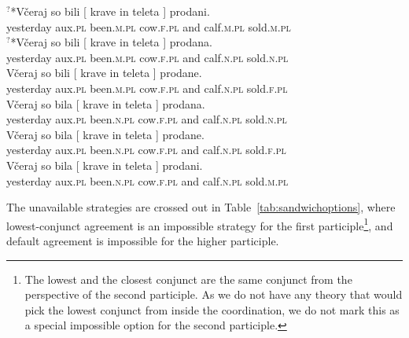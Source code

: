 \documentclass[output=paper
,modfonts
,nonflat]{langsci/langscibook}
\begin{document}
\begin{exe}
\ex \label{allpossiblesand}
\begin{xlist}
\ex \label{alldefdef}\gll $^?$*Včeraj      so    bili       [ krave    in    teleta ]    prodani.\\
yesterday aux.\textsc{pl} been.\textsc{m.pl} {} cow.\textsc{f.pl} and calf.\textsc{m.pl} {}   sold.\textsc{m.pl}\\
\ex \label{alldefcca}\gll $^?$*Včeraj      so    bili       [ krave    in    teleta ]    prodana. \\
yesterday aux.\textsc{pl} been.\textsc{m.pl} {} cow.\textsc{f.pl} and calf.\textsc{n.pl} {}   sold.\textsc{n.pl}\\
\ex \label{alldefhca}\gll  *Včeraj      so    bili       [ krave    in    teleta ]    prodane. \\
yesterday aux.\textsc{pl} been.\textsc{m.pl} {} cow.\textsc{f.pl} and calf.\textsc{n.pl} {}   sold.\textsc{f.pl}\\
\ex \label{alllcacca}\gll  *Včeraj      so    bila       [ krave    in    teleta ]    prodana. \\
yesterday aux.\textsc{pl} been.\textsc{n.pl} {} cow.\textsc{f.pl} and calf.\textsc{n.pl} {}   sold.\textsc{n.pl}\\
\ex \label{alllcahca}\gll  *Včeraj      so    bila       [ krave    in    teleta ]    prodane. \\
yesterday aux.\textsc{pl} been.\textsc{n.pl} {} cow.\textsc{f.pl} and calf.\textsc{n.pl} {}   sold.\textsc{f.pl}\\
\ex \label{alllcadef}\gll  *Včeraj      so    bila       [ krave    in    teleta ]    prodani. \\
yesterday aux.\textsc{pl} been.\textsc{n.pl} {} cow.\textsc{f.pl} and calf.\textsc{n.pl} {}   sold.\textsc{m.pl}\\
\end{xlist}
\end{exe}
The unavailable strategies are crossed out in Table~\ref{tab:sandwichoptions}, where lowest-conjunct agreement is an impossible strategy for the first participle\footnote{The lowest and the closest conjunct are the same conjunct from the perspective of the second participle. As we do not have any theory that would pick the lowest conjunct from inside the coordination, we do not mark this as a special impossible option for the second participle.}, and default agreement is impossible for the higher participle.
\end{document}
